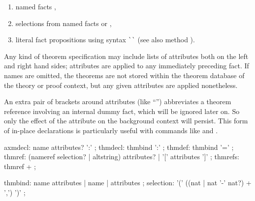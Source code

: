 \begin{isabellebody}
\begin{isamarkuptext}
\begin{enumerate}
  \item named facts ,

  \item selections from named facts  or ,

  \item literal fact propositions using \hyperlink{syntax.altstring}{\mbox{}} syntax
  \verb|`|\isa{{\isachardoublequote}{\isasymphi}{\isachardoublequote}}\verb|`| (see also method
  \hyperlink{method.fact}{\mbox{}}).

  \end{enumerate}

  Any kind of theorem specification may include lists of attributes
  both on the left and right hand sides; attributes are applied to any
  immediately preceding fact.  If names are omitted, the theorems are
  not stored within the theorem database of the theory or proof
  context, but any given attributes are applied nonetheless.

  An extra pair of brackets around attributes (like ``'') abbreviates a theorem reference involving an
  internal dummy fact, which will be ignored later on.  So only the
  effect of the attribute on the background context will persist.
  This form of in-place declarations is particularly useful with
  commands like \hyperlink{command.declare}{\mbox{}} and \hyperlink{command.using}{\mbox{}}.

  \begin{rail}
    axmdecl: name attributes? ':'
    ;
    thmdecl: thmbind ':'
    ;
    thmdef: thmbind '='
    ;
    thmref: (nameref selection? | altstring) attributes? | '[' attributes ']'
    ;
    thmrefs: thmref +
    ;

    thmbind: name attributes | name | attributes
    ;
    selection: '(' ((nat | nat '-' nat?) + ',') ')'
    ;
  \end{rail}%
\end{isamarkuptext}%
\isamarkuptrue%
%
\isadelimtheory
%
\endisadelimtheory
%
\isatagtheory
{}\isamarkupfalse%
%
\endisatagtheory
{\isafoldtheory}%
%
\isadelimtheory
%
\endisadelimtheory
\isanewline
\end{isabellebody}%
